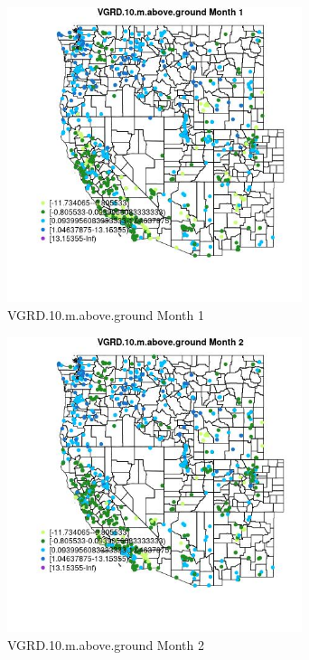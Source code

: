 \begin{figure} 
\centering  
\includegraphics[width=0.77\textwidth]{Code_Outputs/Report_ML_input_PM25_Step4_part_f_de_duplicated_aves_prioritize_24hr_obswNAs_MapObsMo1VGRD10maboveground.jpg} 
\caption{\label{fig:Report_ML_input_PM25_Step4_part_f_de_duplicated_aves_prioritize_24hr_obswNAsMapObsMo1VGRD10maboveground}VGRD.10.m.above.ground Month 1} 
\end{figure} 
 

\begin{figure} 
\centering  
\includegraphics[width=0.77\textwidth]{Code_Outputs/Report_ML_input_PM25_Step4_part_f_de_duplicated_aves_prioritize_24hr_obswNAs_MapObsMo2VGRD10maboveground.jpg} 
\caption{\label{fig:Report_ML_input_PM25_Step4_part_f_de_duplicated_aves_prioritize_24hr_obswNAsMapObsMo2VGRD10maboveground}VGRD.10.m.above.ground Month 2} 
\end{figure} 
 

